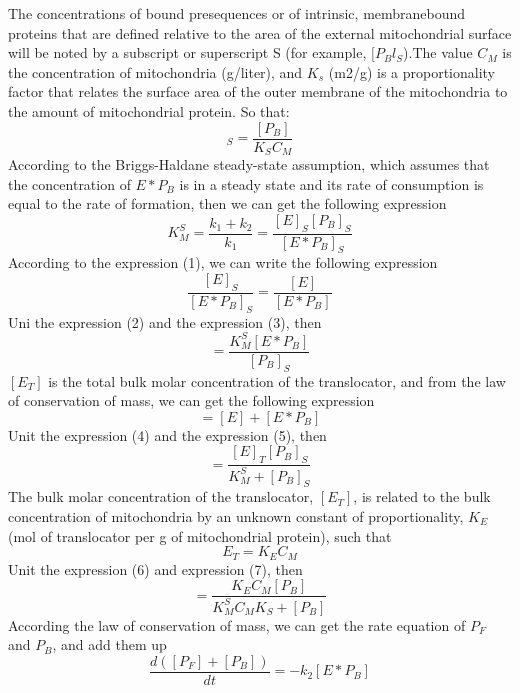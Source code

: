 \documentclass[a4paper,10pt]{article}
\begin{document}
The concentrations of bound presequences or of intrinsic, membranebound proteins that are defined relative to the area of the external mitochondrial surface will be noted by a subscript or superscript S (for example, $[P_Bl_S$).The value $C_M$ is the concentration of mitochondria (g/liter), and $K_s$ (m2/g) is a proportionality factor that relates the surface area of the outer membrane of the mitochondria to the amount of mitochondrial protein. So that:
\begin{equation}
[P_B]_S=\frac{[P_B]}{K_S C_M}
\end{equation}
According to the Briggs-Haldane steady-state assumption, which assumes that the concentration of $E*P_B$ is in a steady state and its rate of consumption is equal to the rate of formation, then we can get the following expression
\begin{equation}
K_M^S=\frac{k_1+k_2}{k_1}=\frac{[E]_S [P_B]_S}{[E*P_B]_S}
\end{equation}
According to the expression (1), we can write the following expression
\begin{equation}
\frac{[E]_S}{[E*P_B]_S}=\frac{[E]}{[E*P_B]}
\end{equation}
Uni the expression (2) and the expression (3), then 
\begin{equation}
[E]=\frac{K_M^S[E*P_B]}{[P_B]_S}
\end{equation}
$[E_T]$ is the total bulk molar concentration of the translocator, and from the law of conservation of mass, we can get the following expression
\begin{equation}
[E_T]=[E]+[E*P_B]
\end{equation}
Unit the expression (4) and the expression (5), then
\begin{equation}
[E*P_B]=\frac{[E]_T[P_B]_S}{K_M^S+[P_B]_S}
\end{equation}
The bulk molar concentration of the translocator, $[E_T]$, is related to the bulk concentration of mitochondria by an unknown constant of proportionality, $K_E$ (mol of translocator per g of mitochondrial protein), such that
\begin{equation}
E_T=K_EC_M
\end{equation}
Unit the expression (6) and expression (7), then
\begin{equation}
[E*P_B]=\frac{K_EC_M[P_B]}{K_M^SC_MK_S+[P_B]}
\end{equation}
According the law of conservation of mass, we can get the rate equation of $P_F$ and $P_B$, and add them up
\begin{equation}
\frac{d([P_F]+[P_B])}{d t}=-k_2[E*P_B]
\end{equation}
\end{document}
